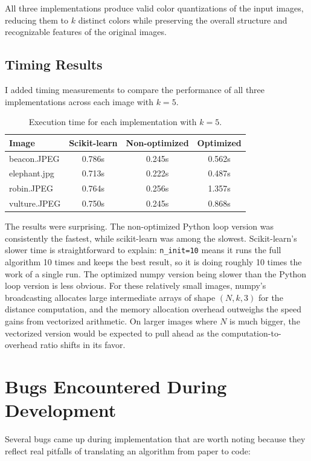 \documentclass[12pt]{article}
\begin{document}
All three implementations produce valid color quantizations of the input
images, reducing them to $k$ distinct colors while preserving the overall
structure and recognizable features of the original images.

\subsection{Timing Results}

I added timing measurements to compare the performance of all three
implementations across each image with $k = 5$.

\begin{table}[h]
\centering
\begin{tabular}{lccc}
\toprule
Image & Scikit-learn & Non-optimized & Optimized \\
\midrule
beacon.JPEG   & 0.786s & 0.245s & 0.562s \\
elephant.jpg  & 0.713s & 0.222s & 0.487s \\
robin.JPEG    & 0.764s & 0.256s & 1.357s \\
vulture.JPEG  & 0.750s & 0.245s & 0.868s \\
\bottomrule
\end{tabular}
\caption{Execution time for each implementation with $k = 5$.}
\end{table}

The results were surprising. The non-optimized Python loop version was
consistently the fastest, while scikit-learn was among the slowest.
Scikit-learn's slower time is straightforward to explain: \texttt{n\_init=10}
means it runs the full algorithm 10 times and keeps the best result, so it is
doing roughly 10 times the work of a single run. The optimized numpy version
being slower than the Python loop version is less obvious. For these
relatively small images, numpy's broadcasting allocates large intermediate
arrays of shape $(N, k, 3)$ for the distance computation, and the memory
allocation overhead outweighs the speed gains from vectorized arithmetic. On
larger images where $N$ is much bigger, the vectorized version would be
expected to pull ahead as the computation-to-overhead ratio shifts in its
favor.

\section{Bugs Encountered During Development}

Several bugs came up during implementation that are worth noting because they
reflect real pitfalls of translating an algorithm from paper to code:
\end{document}

